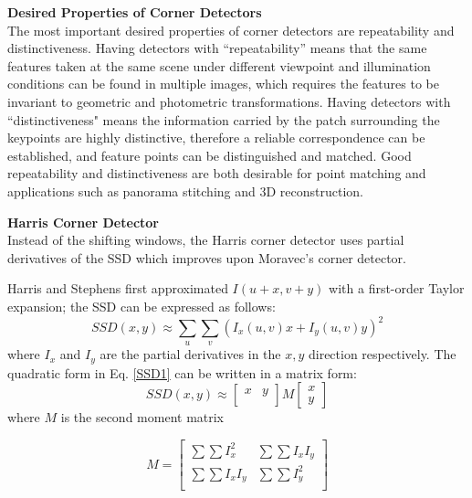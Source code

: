 \documentclass[twoside]{article}
\begin{document}
\textbf{Desired Properties of Corner Detectors}\\
The most important desired properties of corner detectors are repeatability and distinctiveness. Having detectors with ``repeatability'' means that the same features taken at the same scene under different viewpoint and illumination conditions can be found in multiple images, which requires the features to be invariant to geometric and photometric transformations. Having detectors with ``distinctiveness" means the information carried by the patch surrounding the keypoints are highly distinctive, therefore a reliable correspondence can be established, and feature points can be distinguished and matched. Good repeatability and distinctiveness are both desirable for point matching and applications such as panorama stitching and 3D reconstruction.

\textbf{Harris Corner Detector}\\
Instead of the shifting windows, the Harris corner detector \cite{Harris} uses partial derivatives of the SSD which improves upon Moravec's corner detector.

Harris and Stephens first approximated $I(u+x,v+y)$ with a first-order Taylor expansion; the SSD can be expressed as follows:
\begin{equation}
SSD(x,y) \approx \sum_u \sum_v (I_x(u,v)x+I_y(u,v)y)^2
\label{SSD1}
\end{equation}
where $I_x$ and $I_y$ are the partial derivatives in the $x, y$ direction respectively. The quadratic form in Eq. \ref{SSD1} can be written in a matrix form:
\begin{equation}
SSD(x,y) \approx
\begin{bmatrix}
x & y\\
\end{bmatrix}
M
\begin{bmatrix}
x \\y
\end{bmatrix}
\end{equation}
where $M$ is the second moment matrix

\begin{equation}
M =
\begin{bmatrix}
\sum \sum I_x^2 & \sum \sum I_x I_y \\
\sum \sum I_x I_y & \sum \sum I_y^2 \\
\end{bmatrix}
\end{equation}
\end{document}
